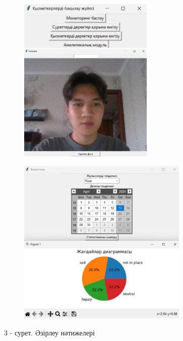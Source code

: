 \begin{figure}[H]
	\centering
	\begin{subfigure}{0.48\textwidth}
		\centering
		\includegraphics[height=8cm]{media/ict2/image161}
	\end{subfigure}
	\begin{subfigure}{0.48\textwidth}
		\centering
		\includegraphics[height=8cm]{media/ict2/image162}
	\end{subfigure}
    \caption*{3 - сурет. Әзірлеу нәтижелері}
\end{figure}


